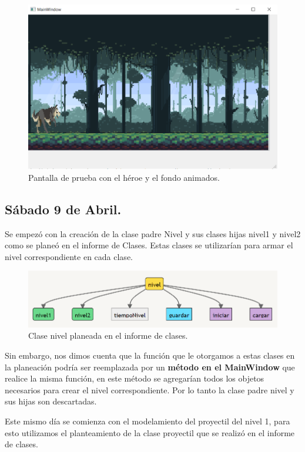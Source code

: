\documentclass{article}
\begin{document}
\begin{figure}[h]
\includegraphics[scale=0.6]{Images/animaciones.png}
\centering
\caption{Pantalla de prueba con el héroe y el fondo animados.}
\label{fig:animacion}
\end{figure}

\newpage
\subsection{Sábado 9 de Abril.}
Se empezó con la creación de la clase padre Nivel y sus clases hijas nivel1 y nivel2 como se planeó en el informe de Clases. Estas clases se utilizarían para armar el nivel correspondiente en cada clase.

\begin{figure}[h]
\includegraphics[scale=0.6]{Images/niveles.png}
\centering
\caption{Clase nivel planeada en el informe de clases.}
\label{fig:niveles}
\end{figure}

Sin embargo, nos dimos cuenta que la función que le otorgamos a estas clases en la planeación podría ser reemplazada por un \textbf{método en el MainWindow} que realice la misma función, en este método se agregarían todos los objetos necesarios para crear el nivel correspondiente. Por lo tanto la clase padre nivel y sus hijas son descartadas.

Este mismo día se comienza con el modelamiento del proyectil del nivel 1, para esto utilizamos el planteamiento de la clase proyectil que se realizó en el informe de clases.
\end{document}
